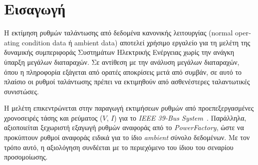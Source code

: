 \chapter{Εισαγωγή}

Η εκτίμηση ρυθμών ταλάντωσης από δεδομένα κανονικής λειτουργίας \textenglish{(normal operating condition data ή ambient data)} αποτελεί χρήσιμο εργαλείο για τη μελέτη της δυναμικής συμπεριφοράς Συστημάτων Ηλεκτρικής Ενέργειας χωρίς την ανάγκη ύπαρξη μεγάλων διαταραχών. Σε αντίθεση με την ανάλυση μεγάλων διαταραχών, όπου η πληροφορία εξάγεται από ορατές αποκρίσεις μετά από συμβάν, σε αυτό το πλαίσιο οι ρυθμοί ταλάντωσης πρέπει να εκτιμηθούν από ασθενέστερες ταλαντωτικές συνιστώσες.

Η μελέτη επικεντρώνεται στην παραγωγή εκτιμήσεων ρυθμών από προεπεξεργασμένες χρονοσειρές τάσης και ρεύματος ($V$, $I$) για το \textenglish{\textit{IEEE 39-Bus System}}~\cite{digsilent39}. Παράλληλα, αξιοποιείται ξεχωριστή εξαγωγή ρυθμών αναφοράς από το \textenglish{\textit{PowerFactory}}, ώστε να προκύπτουν ρυθμοί αναφοράς ειδικά για το ίδιο \textenglish{\textit{ambient}} σύνολο δεδομένων. Με τον τρόπο αυτό, η αξιολόγηση συνδέεται με το περιεχόμενο του ίδιου του σεναρίου προσομοίωσης.
